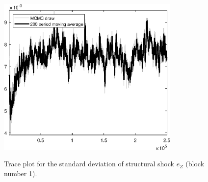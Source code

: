 \begin{figure}[H]
\centering
  \includegraphics[width=0.8\textwidth]{BRS/graphs/TracePlot_SE_e_Z_blck_1}\\
    \caption{Trace plot for the standard deviation of structural shock ${e_Z}$ (block number 1).}
\end{figure}
